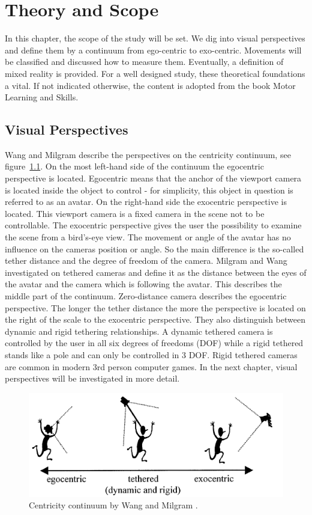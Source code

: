 \chapter{Theory and Scope}
In this chapter, the scope of the study will be set. We dig into visual perspectives and define them by a continuum from ego-centric to exo-centric. Movements will be classified and discussed how to measure them. Eventually, a definition of mixed reality is provided. For a well designed study, these theoretical foundations a vital. If not indicated otherwise, the content is adopted from the book Motor Learning and Skills\cite{Schmidt2011}. 

\section{Visual Perspectives}
Wang and Milgram \cite{Wang2001} describe the perspectives on the centricity continuum, see figure~\ref{fig:ego-exo-cont}. On the most left-hand side of the continuum the egocentric perspective is located. Egocentric means that the anchor of the viewport camera is located inside the object to control - for simplicity, this object in question is referred to as an avatar. On the right-hand side the exocentric perspective is located. This viewport camera is a fixed camera in the scene not to be controllable. The exocentric perspective gives the user the possibility to examine the scene from a bird's-eye view. The movement or angle of the avatar has no influence on the cameras position or angle. So the main difference is the so-called tether distance and the degree of freedom of the camera. Milgram and Wang investigated on tethered cameras and define it as the distance between the eyes of the avatar and the camera which is following the avatar. This describes the middle part of the continuum. Zero-distance camera describes the egocentric perspective. The longer the tether distance the more the perspective is located on the right of the scale to the exocentric perspective. They also distinguish between dynamic and rigid tethering relationships. A dynamic tethered camera is controlled by the user in all six degrees of freedoms (DOF) while a rigid tethered stands like a pole and can only be controlled in 3 DOF. Rigid tethered cameras are common in modern 3rd person computer games. In the next chapter, visual perspectives will be investigated in more detail.
\begin{figure}
	\centering
	\includegraphics[width=1.0\textwidth]{img/ego_exo_continuum_bigger.PNG}
	\caption{Centricity continuum by Wang and Milgram \cite{Wang2001}.}
	\label{fig:ego-exo-cont}
\end{figure}

